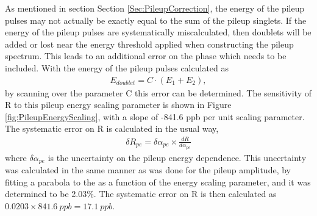		As mentioned in section Section \ref{Sec:PileupCorrection}, the energy of the pileup pulses may not actually be exactly equal to the sum of the pileup singlets. If the energy of the pileup pulses are systematically miscalculated, then doublets will be added or lost near the energy threshold applied when constructing the pileup spectrum. This leads to an additional error on the phase which needs to be included. With the energy of the pileup pulses calculated as
			\begin{align}
				E_{doublet} = C \cdot (E_{1} + E_{2}),
			\end{align}
		by scanning over the parameter C this error can be determined. The sensitivity of R to this pileup energy scaling parameter is shown in Figure \ref{fig:PileupEnergyScaling}, with a slope of -841.6 ppb per unit scaling parameter. The systematic error on R is calculated in the usual way,
			\begin{align}
				\delta R_{pe} = \delta\alpha_{pe} \times \frac{dR}{d\alpha_{pe}}
			\end{align}
		where $\delta\alpha_{pe}$ is the uncertainty on the pileup energy dependence. This uncertainty was calculated in the same manner as was done for the pileup amplitude, by fitting a parabola to the \chisq as a function of the energy scaling parameter, and it was determined to be 2.03\%. The systematic error on R is then calculated as $0.0203 \times \SI{841.6}{ppb} = \SI{17.1}{ppb}$.

